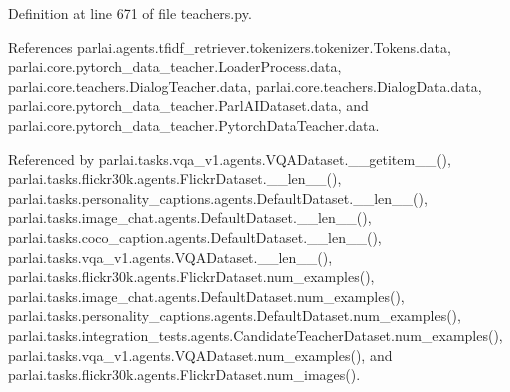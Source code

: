 Definition at line 671 of file teachers.\+py.



References parlai.\+agents.\+tfidf\+\_\+retriever.\+tokenizers.\+tokenizer.\+Tokens.\+data, parlai.\+core.\+pytorch\+\_\+data\+\_\+teacher.\+Loader\+Process.\+data, parlai.\+core.\+teachers.\+Dialog\+Teacher.\+data, parlai.\+core.\+teachers.\+Dialog\+Data.\+data, parlai.\+core.\+pytorch\+\_\+data\+\_\+teacher.\+Parl\+A\+I\+Dataset.\+data, and parlai.\+core.\+pytorch\+\_\+data\+\_\+teacher.\+Pytorch\+Data\+Teacher.\+data.



Referenced by parlai.\+tasks.\+vqa\+\_\+v1.\+agents.\+V\+Q\+A\+Dataset.\+\_\+\+\_\+getitem\+\_\+\+\_\+(), parlai.\+tasks.\+flickr30k.\+agents.\+Flickr\+Dataset.\+\_\+\+\_\+len\+\_\+\+\_\+(), parlai.\+tasks.\+personality\+\_\+captions.\+agents.\+Default\+Dataset.\+\_\+\+\_\+len\+\_\+\+\_\+(), parlai.\+tasks.\+image\+\_\+chat.\+agents.\+Default\+Dataset.\+\_\+\+\_\+len\+\_\+\+\_\+(), parlai.\+tasks.\+coco\+\_\+caption.\+agents.\+Default\+Dataset.\+\_\+\+\_\+len\+\_\+\+\_\+(), parlai.\+tasks.\+vqa\+\_\+v1.\+agents.\+V\+Q\+A\+Dataset.\+\_\+\+\_\+len\+\_\+\+\_\+(), parlai.\+tasks.\+flickr30k.\+agents.\+Flickr\+Dataset.\+num\+\_\+examples(), parlai.\+tasks.\+image\+\_\+chat.\+agents.\+Default\+Dataset.\+num\+\_\+examples(), parlai.\+tasks.\+personality\+\_\+captions.\+agents.\+Default\+Dataset.\+num\+\_\+examples(), parlai.\+tasks.\+integration\+\_\+tests.\+agents.\+Candidate\+Teacher\+Dataset.\+num\+\_\+examples(), parlai.\+tasks.\+vqa\+\_\+v1.\+agents.\+V\+Q\+A\+Dataset.\+num\+\_\+examples(), and parlai.\+tasks.\+flickr30k.\+agents.\+Flickr\+Dataset.\+num\+\_\+images().

